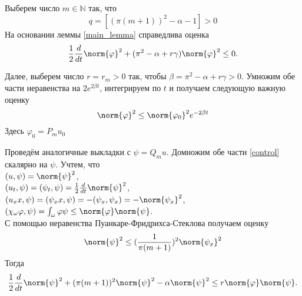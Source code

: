 \par
\vspace{2ex}
Выберем число $m \in \mathbb{N}$ так, что 
\begin{equation}
	q = [(\pi(m + 1))^2 - \alpha - 1] > 0	
\end{equation}
На основании леммы \ref{main_lemma} справедлива оценка
\begin{equation*}
	\frac{1}{2} \frac{d}{dt} \norm{\varphi}^2 + (\pi^2 - \alpha + r\gamma) \norm{\varphi}^2 \le 0.
\end{equation*}

Далее, выберем число $r = r_m > 0$ так, чтобы $\beta = \pi^2 - \alpha + r\gamma > 0$. 
Умножим обе части неравенства на $2e^{2\beta t}$, интегрируем по $t$ и получаем следующую важную оценку
\begin{equation}\label{phi_mark}
	\norm{\varphi}^2 \le \norm{\varphi_0}^2 e^{-2\beta t}
\end{equation}
Здесь $\varphi_0 = P_m u_0$
\vspace{2em}

Проведём аналогичные выкладки с $\psi = Q_m u$. Домножим обе части \eqref{control} скалярно на $\psi$. Учтем, что \\
$(u, \psi) = \norm{\psi}^2$,\\
$(u_t, \psi) = (\psi_t, \psi) = \frac{1}{2} \frac{d}{dt} \norm{\psi}^2$,\\
$(u_xx, \psi) = (\psi_xx, \psi) = -(\psi_x, \psi_x) = - \norm{\psi_x}^2$,\\
$(\chi_{\omega}\varphi, \psi) = \int_{\omega}{\varphi \psi} \le \norm{\varphi} \norm{\psi}$.\\

С помощью неравенства Пуанкаре-Фридрихса-Стеклова получаем оценку
\begin{equation}
 	\norm{\psi}^2 \le (\frac{1}{\pi(m + 1)})^2 \norm{\psi_x}^2
\end{equation}
Тогда
\begin{equation}\label{v2}
	\frac{1}{2} \frac{d}{dt} \norm{\psi}^2 + (\pi(m + 1))^2 \norm{\psi}^2 - \alpha \norm{\psi}^2 \le r \norm{\varphi} \norm{\psi}.				
\end{equation}

